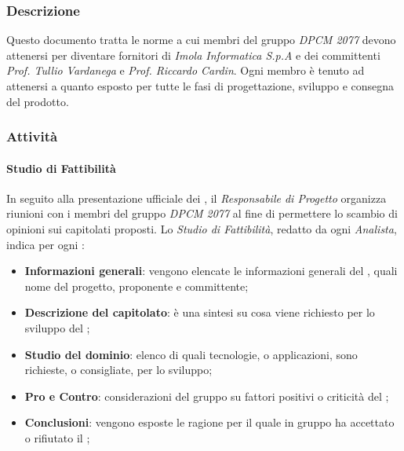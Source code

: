 		\subsubsection{Descrizione}
		Questo documento tratta le norme a cui membri del gruppo \textit{DPCM 2077} devono attenersi per diventare fornitori di \textit{Imola Informatica S.p.A} e dei committenti \textit{Prof. Tullio Vardanega} e \textit{Prof. Riccardo Cardin}. Ogni membro è tenuto ad attenersi a quanto esposto per tutte le fasi di progettazione, sviluppo e consegna del prodotto.
		\subsubsection{Attività}
			\paragraph{Studio di Fattibilità}
			In seguito alla presentazione ufficiale dei , il \textit{Responsabile di Progetto} organizza riunioni con i membri del gruppo \textit{DPCM 2077} al fine di permettere lo scambio di opinioni sui capitolati proposti. Lo \textit{Studio di Fattibilità}, redatto da ogni \textit{Analista}, indica per ogni :
			\begin{itemize}
				\item \textbf{Informazioni generali}: vengono elencate le informazioni generali del , quali nome del progetto, proponente e committente;
				\item \textbf{Descrizione del capitolato}: è una sintesi su cosa viene richiesto per lo sviluppo del ;
				\item \textbf{Studio del dominio}: elenco di quali tecnologie, o applicazioni, sono richieste, o consigliate, per lo sviluppo;
				\item \textbf{Pro e Contro}: considerazioni del gruppo su fattori positivi o criticità del ;
				\item \textbf{Conclusioni}: vengono esposte le ragione per il quale in gruppo ha accettato o rifiutato il ;
			\end{itemize}
